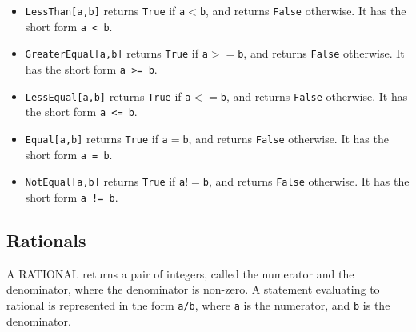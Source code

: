 \begin{itemize}
\item
\verb+LessThan[a,b]+ returns \verb+True+ if \verb+a+$<$\verb+b+, and
returns \verb+False+ otherwise.  It has the short form \verb+a < b+.

\item
\verb+GreaterEqual[a,b]+ returns \verb+True+ if \verb+a+$>=$\verb+b+, and
returns \verb+False+ otherwise.  It has the short form \verb+a >= b+.

\item
\verb+LessEqual[a,b]+ returns \verb+True+ if \verb+a+$<=$\verb+b+, and
returns \verb+False+ otherwise.  It has the short form \verb+a <= b+.

\item
\verb+Equal[a,b]+ returns \verb+True+ if \verb+a+$=$\verb+b+, and
returns \verb+False+ otherwise.  It has the short form \verb+a = b+.

\item
\verb+NotEqual[a,b]+ returns \verb+True+ if \verb+a+$!=$\verb+b+, and
returns \verb+False+ otherwise.  It has the short form \verb+a != b+.
\ed
\end{itemize}

\subsection{Rationals}

A RATIONAL returns a pair of integers, called the numerator and the
denominator, where the denominator is
non-zero.  A statement evaluating to rational is represented in the
form \verb+a/b+, where \verb+a+ is the numerator, and \verb+b+ is the
denominator.  

